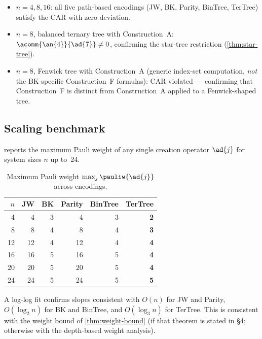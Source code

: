\begin{itemize}
  \item $n = 4, 8, 16$: all five path-based encodings (JW, BK,
    Parity, BinTree, TerTree) satisfy the CAR with zero deviation.
  \item $n = 8$, balanced ternary tree with Construction~A:
    $\acomm{\an{4}}{\ad{7}} \neq 0$, confirming the star-tree
    restriction (\cref{thm:star-tree}).
  \item $n = 8$, Fenwick tree with Construction~A (generic
    index-set computation, \emph{not} the BK-specific
    Construction~F formulas): CAR violated — confirming that
    Construction~F is distinct from Construction~A applied to a
    Fenwick-shaped tree.
\end{itemize}

\subsection{Scaling benchmark}
\label{sec:val-scaling}

 reports the maximum Pauli weight of any single
creation operator $\ad{j}$ for system sizes $n$ up to~24.

\begin{table}[t]
\centering
\caption{Maximum Pauli weight $\max_j \pauliw{\ad{j}}$ across
  encodings.}
\label{tab:scaling}
\begin{tabular}{@{}rrrrrr@{}}
\toprule
$n$ & JW & BK & Parity & BinTree & TerTree \\
\midrule
 4  &  4 &  3 &  4 &  3 & \textbf{2} \\
 8  &  8 &  4 &  8 &  4 & \textbf{3} \\
12  & 12 &  4 & 12 &  4 & \textbf{4} \\
16  & 16 &  5 & 16 &  5 & \textbf{4} \\
20  & 20 &  5 & 20 &  5 & \textbf{4} \\
24  & 24 &  5 & 24 &  5 & \textbf{5} \\
\bottomrule
\end{tabular}
\end{table}

A log-log fit confirms slopes consistent with $O(n)$ for JW and
Parity, $O(\log_2 n)$ for BK and BinTree, and $O(\log_3 n)$ for
TerTree.  This is consistent with the weight bound of
\cref{thm:weight-bound} (if that theorem is stated in §4; otherwise
with the depth-based weight analysis).

